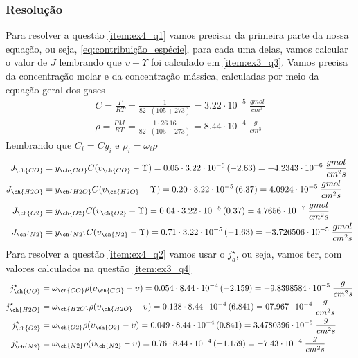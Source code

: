 \subsubsection{Resolução}
Para resolver a questão \ref{item:ex4_q1} vamos precisar da primeira parte da nossa equação, ou
seja, \ref{eq:contribuição_espécie}, para cada uma delas, vamos calcular o valor de \(J\) lembrando
que \(\upsilon  - \Upsilon \) foi calculado em \ref{item:ex3_q3}. Vamos precisa da concentração molar e da
concentração mássica, calculadas por meio da equação geral dos gases
\begin{align}
        C = \frac{P}{RT} = \frac{1}{82 \cdot (105 + 273)} = 3.22 \cdot 10^{-5} \; \frac{gmol}{cm^{3}}\\
        \rho = \frac{PM}{RT} = \frac{1 \cdot 26.16}{82 \cdot (105 + 273)} = 8.44 \cdot 10^{-4} \; \frac{g}{cm^{3}} 
\end{align}
Lembrando que \(C_{i} = C  y_{i} \) e \(\rho _{i} = \omega _{i} \rho \) 
\begin{align}
    J_{\ch{CO}} &= y_{\ch{CO}} C (\upsilon_{\ch{CO}} - \Upsilon ) = 0.05 \cdot 3.22 \cdot 10^{-5} \left( -2.63 \right)  = -4.2343 \cdot 10^{-6} \; \frac{gmol}{cm^{2} s}\\
    J_{\ch{H2O}} &= y_{\ch{H2O}} C (\upsilon_{\ch{H2O}} - \Upsilon ) = 0.20 \cdot 3.22 \cdot 10^{-5} \left( 6.37 \right)  = 4.0924 \cdot 10^{-5} \; \frac{gmol}{cm^{2} s}\\
    J_{\ch{O2}} &= y_{\ch{O2}} C (\upsilon_{\ch{O2}} - \Upsilon ) = 0.04 \cdot 3.22 \cdot 10^{-5} \left( 0.37 \right) = 4.7656 \cdot 10^{-7} \; \frac{gmol}{cm^{2} s}\\
    J_{\ch{N2}} &= y_{\ch{N2}} C (\upsilon_{\ch{N2}} - \Upsilon ) = 0.71 \cdot 3.22 \cdot 10^{-5} \left( -1.63 \right) = -3.726506 \cdot 10^{-5}\; \frac{gmol}{cm^{2} s}
\end{align}
Para resolver a questão \ref{item:ex4_q2} vamos usar o \(j_{a} ^{\star} \), ou seja, vamos ter, com
valores calculados na questão \ref{item:ex3_q4}
\begin{align}
    j_{\ch{CO}} ^{\star} &= \omega_{\ch{CO}} \rho (\upsilon_{\ch{CO}} - \upsilon ) = 0.054 \cdot 8.44 \cdot 10^{-4} \left( -2.159 \right) = -9.8398584 \cdot 10^{-5} \; \frac{g}{cm^{2} s}\\
    j_{\ch{H2O}} ^{\star} &= \omega_{\ch{H2O}} \rho (\upsilon_{\ch{H2O}} - \upsilon ) = 0.138 \cdot 8.44 \cdot 10^{-4} \left( 6.841 \right) = 07.967 \cdot 10^{-4}  \; \frac{g}{cm^{2} s}\\
    j_{\ch{O2}} ^{\star} &= \omega_{\ch{O2}} \rho (\upsilon_{\ch{O2}} - \upsilon ) = 0.049 \cdot 8.44 \cdot 10^{-4} \left( 0.841 \right) = 3.4780396 \cdot 10^{-5} \; \frac{g}{cm^{2} s}\\
    j_{\ch{N2}} ^{\star} &= \omega_{\ch{N2}} \rho (\upsilon_{\ch{N2}} - \upsilon ) = 0.76 \cdot 8.44 \cdot 10^{-4} \left( -1.159 \right) = -7.43\cdot 10^{-4} \; \frac{g}{cm^{2} s}
\end{align}
